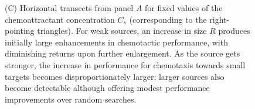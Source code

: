 \documentclass[9pt,twocolumn,twoside]{pnas-new}
\begin{document}
\begin{figure}
{        (C) Horizontal transects from panel $A$ for fixed values of the chemoattractant concentration $C_s$ (corresponding to the right-pointing triangles).
        For weak sources, an increase in size $R$ produces initially large enhancements in chemotactic performance, with diminishing returns upon further enlargement.
        As the source gets stronger, the increase in performance for chemotaxis towards small targets becomes disproportionately larger; larger sources also become detectable although offering modest performance improvements over random searches.
    }
    \label{fig:asymmetric-performance}
\end{figure}
\end{document}
